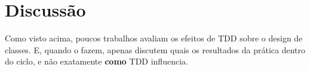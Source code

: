








\section{Discussão}

Como visto acima, poucos trabalhos avaliam os efeitos de TDD sobre o design de
classes. E, quando o fazem, apenas discutem quais os resultados da prática
dentro do ciclo, e não exatamente \textbf{como} TDD influencia. 

